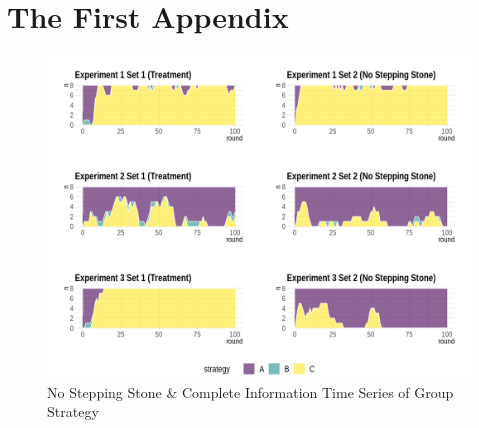 \appendix
\renewcommand\thefigure{\thechapter.\arabic{figure}}
\renewcommand\thetable{\thechapter.\arabic{table}}


\chapter{The First Appendix}

\begin{figure}[h]
\captionsetup{justification=centering}
  \caption{No Stepping Stone \& Complete Information Time Series of Group Strategy}
   \label{fig:Series1C}
    \includegraphics[width = \textwidth]{Images/AllAreaPlot1C.png}
    
\end{figure}

